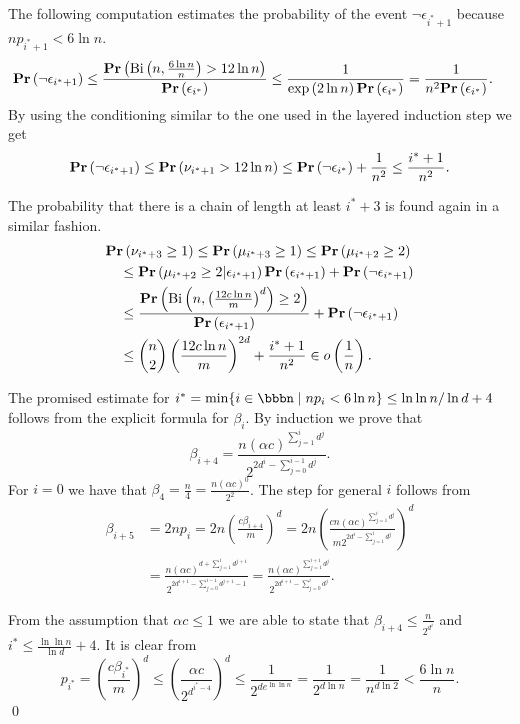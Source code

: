 \documentclass[runningheads,a4paper]{llncs}
\begin{document}
The following computation estimates the probability of the event $\neg \epsilon_{i^* + 1}$ because $np_{i^* + 1} < 6 \ln n$.
\[
\begin{split}
\mathbf{Pr}\left(\neg \epsilon_{i^* + 1}\right)
	\leq \frac{\mathbf{Pr}\left(\mathrm{Bi}\left(n, \frac{6 \ln n}{n}\right) > 12 \ln n\right)}{\mathbf{Pr}\left(\epsilon_{i^*}\right)} 
	& \leq \frac{1}{\exp\left(2 \ln n\right)\mathbf{Pr}\left(\epsilon_{i^*}\right)} = \frac{1}{n ^ 2 \mathbf{Pr}\left(\epsilon_{i^*}\right)} \textit{.}
\end{split}
\]
By using the conditioning similar to the one used in the layered induction step we get
\[
\mathbf{Pr}\left(\neg \epsilon_{i^* + 1}\right) \leq \mathbf{Pr}\left(\nu_{i^* + 1} > 12 \ln n\right) \leq \mathbf{Pr}\left(\neg \epsilon_{i^*}\right) + \frac{1}{n ^ 2} \leq \frac{i^* + 1}{n ^ 2} \textit{.}
\]

The probability that there is a chain of length at least $i^* + 3$ is found again in a similar fashion.
\[
\begin{split}
& \mathbf{Pr}\left(\nu_{i^* + 3} \geq 1\right)
	\leq \mathbf{Pr}\left(\mu_{i^* + 3} \geq 1\right) \leq \mathbf{Pr}\left(\mu_{i^* + 2} \geq 2\right) \\
	& \quad \leq \mathbf{Pr}\left(\mu_{i^* + 2} \geq 2 | \epsilon_{i^* + 1}\right)\mathbf{Pr}\left(\epsilon_{i^* + 1}\right) + \mathbf{Pr}\left(\neg \epsilon_{i^* + 1}\right) \\
	& \quad \leq \frac{\mathbf{Pr}\left(\mathrm{Bi}\left(n, \left(\frac{12 c \ln n}{m}\right) ^ d\right) \geq 2\right)}{\mathbf{Pr}\left(\epsilon_{i^* + 1}\right)} + \mathbf{Pr}\left(\neg \epsilon_{i^* + 1}\right) \\
	& \quad \leq \binom{n}{2} \left(\frac{12 c \ln n}{m}\right) ^ {2d} + \frac{i^* + 1}{n ^ 2} \in o\left(\frac{1}{n}\right) \textit{.}
\end{split}
\]

The promised estimate for $i^* = \displaystyle\min \{i \in \bbbn \setdelim np_i < 6 \ln n\} \leq \ln \ln n / \ln d + 4$ follows from the explicit formula for $\beta_i$. By induction we prove that $$\beta_{i + 4} = \frac{n \left(\alpha c\right) ^ {\sum_{j = 1}^{i}d ^ j}}{2 ^ {2 d ^ i - \sum_{j = 0}^{i - 1}{d ^ j}}} \textit{.}$$ For $i = 0$ we have that $\beta_4 = \frac{n}{4} = \frac{n\left(\alpha c\right) ^ 0}{2 ^ {2}}$. The step for general $i$ follows from
\[
\begin{split}
\beta_{i + 5} 
	& = 2np_i = 2n \left(\frac{c\beta_{i + 4}}{m}\right) ^ d = 2n \left(\frac{cn\left(\alpha c\right) ^ {\sum_{j = 1}^{i}d ^ j}}{m 2 ^ {2 d ^ i - \sum_{j = 1}^{i}d^j}}\right) ^ d \\
	& = \frac{n\left(\alpha c\right) ^ {d + \sum_{j = 1}^{i} d ^ {j + 1}}}{2 ^ {2d ^ {i + 1} - \sum_{j = 0}^{i  -1} d ^ {j + 1} - 1}} = \frac{n \left(\alpha c\right) ^ {\sum_{j = 1}^{i + 1} d ^ j}}{2 ^ {2d ^ {i + 1} - \sum_{j = 0}^{i} d ^ j}} \textit{.}
\end{split}
\]

From the assumption that $\alpha c \leq 1$ we are able to state that $\beta_{i + 4} \leq \frac{n}{2 ^ {d ^ i}}$ and $i^* \leq \frac{\ln \ln n}{\ln d} + 4$. It is clear from
\[
p_{i^*} = \left(\frac{c\beta_{i^*}}{m}\right) ^ d \leq \left(\frac{\alpha c}{2 ^ {d ^ {i^* - 4}}}\right) ^ d \leq \frac{1}{2 ^ {de^{\ln \ln n}}} = \frac{1}{2 ^ {d \ln n}} = \frac{1}{n ^ {d \ln 2}} < \frac{6 \ln n}{n}.
\]
\qed
\end{document}

